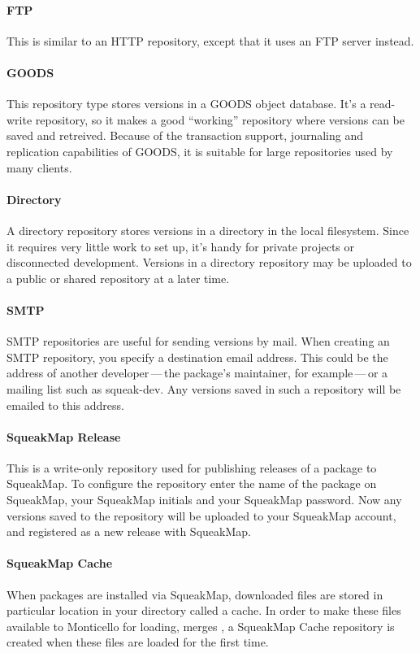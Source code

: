 \documentclass[a4paper,10pt,twoside]{book}
\begin{document}
\paragraph{FTP} This is similar to an HTTP repository, except that it uses an FTP server instead.

\paragraph{GOODS} This repository type stores versions in a GOODS object database. It's a read-write repository, so it makes a good ``working'' repository where versions can be saved and retreived. Because of the transaction support, journaling and replication capabilities of GOODS, it is suitable for large repositories used by many clients.

\paragraph{Directory} A directory repository stores versions in a directory in the local filesystem. Since it requires very little work to set up, it's handy for private projects or disconnected development. Versions in a directory repository may be uploaded to a public or shared repository at a later time.

\paragraph{SMTP} SMTP repositories are useful for sending versions by mail. When creating an SMTP repository, you specify a destination email address. This could be the address of another developer\,---\,the package's maintainer, for example\,---\,or a mailing list such as squeak-dev. Any versions saved in such a repository will be emailed to this address.

\paragraph{SqueakMap Release} This is a write-only repository used for publishing releases of a package to SqueakMap. To configure the repository enter the name of the package on SqueakMap, your SqueakMap initials and your SqueakMap password. Now any versions saved to the repository will be uploaded to your SqueakMap account, and registered as a new release with SqueakMap.

\paragraph{SqueakMap Cache} When packages are installed via SqueakMap, downloaded files are stored in particular location in your directory called a cache. In order to make these files available to Monticello for loading, merges \etc, a SqueakMap Cache repository is created when these files are loaded for the first time.
\end{document}
